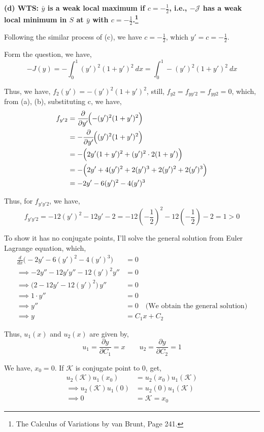 \documentclass[12pt]{article}
\begin{document}
\vspace{10pt}
\noindent
\textbf{(d) WTS: $\bar y$ is a weak local maximum if $c=-\frac{1}{2}$, i.e., $-\mathcal J$ has a weak local minimum in $S$ at $\bar y$ with $c = -\frac{1}{2}$.\footnote{The Calculus of Variations by van Brunt, Page 241.}} 

Following the similar process of (c), we have $c=-\frac{1}{2}$, which $y' = c = -\frac{1}{2}$.

Form the question, we have, 
$$-J(y)=-\int_0^1 (y')^2(1+y')^2\ dx = \int_0^1 -(y')^2(1+y')^2\ dx$$

Thus, we have, $f_2(y') = -(y')^2(1+y')^2$, still, $f_{y2} = f_{yy'2} = f_{yy2} = 0$, which, from (a), (b), substituting c, we have, 
\begin{align*}
f_{y'2}
&=\frac{\partial}{\partial y'}\!\Bigl(-(y')^2(1+y')^2\Bigr) \\
&=-\frac{\partial}{\partial y'}\!\Bigl((y')^2(1+y')^2\Bigr) \\
&= -\Bigl(2y'(1+y')^2 + (y')^2 \cdot 2(1+y')\Bigr) \\
&= -\Bigl(2y' + 4(y')^2 + 2(y')^3 + 2(y')^2 + 2(y')^3\Bigr) \\
&= - 2y' - 6(y')^2 - 4(y')^3
\end{align*}

Thus, for $f_{y'y'2}$, we have,
$$f_{y'y'2} = - 12 (y')^2 - 12y' - 2  = - 12\left(-\frac{1}{2}\right)^2 - 12\left(-\frac{1}{2}\right) - 2 = 1 > 0 $$

To show it has no conjugate points, I'll solve the general solution from Euler Lagrange equation, which, 
\begin{align*}
	\frac{d}{dx} \bigl(- 2y' - 6(y')^2 - 4(y')^3 \bigr) &= 0 \\
	\implies -2y'' - 12y'y'' - 12(y')^2y'' &= 0 \\
	\implies \bigl(2 - 12y' - 12(y')^2\bigr)\,y'' &= 0 \\
	\implies 1 \cdot y'' &= 0\\
	\implies y'' &= 0 \quad \text{(We obtain the general solution)}\\
	\implies y &= C_1x + C_2 
\end{align*}

Thus, $u_1(x)$ and $u_2(x)$ are given by, 
$$u_1 = \frac{\partial y}{\partial C_1} = x \quad \quad u_2 = \frac{\partial y}{\partial C_2} = 1$$

We have, $x_0 = 0$. If $\mathcal K$ is conjugate point to 0, get, 
\begin{align*}
	u_2(\mathcal K)u_1(x_0) &= u_2(x_0)u_1(\mathcal K) \\
	\implies u_2(\mathcal K)u_1(0) &= u_2(0)u_1(\mathcal K) \\
	\implies 0 &= \mathcal K = x_0
\end{align*}
\end{document}
